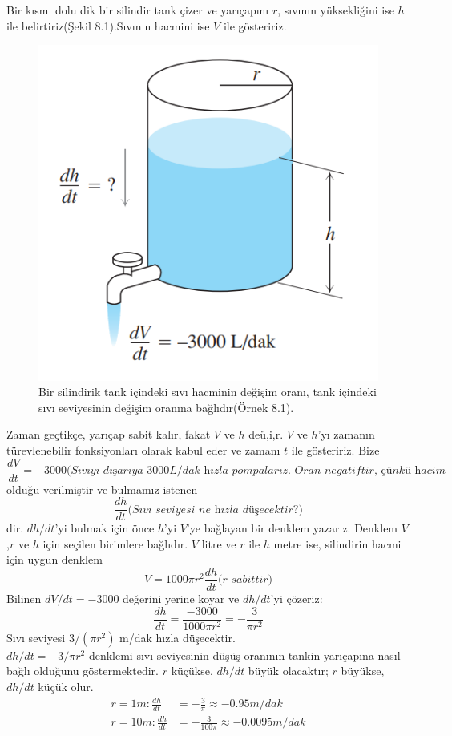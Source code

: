 \begin{cozum}
	Bir kısmı dolu dik bir silindir tank çizer ve yarıçapını $r$, sıvının yüksekliğini ise $h$ ile belirtiriz(Şekil 8.1).Sıvının hacmini ise $V$ ile gösteririz.
\begin{figure}[H]
	\centering
	\includegraphics[width=0.5\linewidth]{iliskilioranlar1.png}
	\caption{Bir silindirik tank içindeki sıvı hacminin değişim oranı, tank içindeki sıvı seviyesinin değişim oranına bağlıdır(Örnek 8.1).}
	\label{fig:ornekresim}
\end{figure}
Zaman geçtikçe, yarıçap sabit kalır, fakat $V$ ve $h$ deü,i,r. $V$ ve $h$'yı zamanın türevlenebilir fonksiyonları olarak kabul eder ve zamanı $t$ ile gösteririz. Bize
	\begin{equation*}
	\frac{dV}{dt}=-3000\textit{(Sıvıyı dışarıya 3000L/dak hızla pompalarız. Oran negatiftir, çünkü hacim azalmaktadır.)}
	\end{equation*}
olduğu verilmiştir ve bulmamız istenen
	\begin{equation*}
	\frac{dh}{dt}\textit{(Sıvı seviyesi ne hızla düşecektir?)}
	\end{equation*}
dir. $dh/dt$'yi bulmak için önce $h$'yi $V$'ye bağlayan bir denklem yazarız. Denklem $V$,$r$ ve $h$ için seçilen birimlere bağlıdır. $V$ litre ve $r$ ile $h$ metre ise, silindirin hacmi için uygun denklem
	\begin{equation*}
	V=1000\pi r^2 \frac{dh}{dt}\textit{($r$ sabittir)}
	\end{equation*}
Bilinen $dV/dt=-3000$ değerini yerine koyar ve $dh/dt$'yi çözeriz:
	\begin{equation*}
	\frac{dh}{dt}=\frac{-3000}{1000\pi r^2}=- \frac{3}{\pi r^2}
	\end{equation*}
Sıvı seviyesi $3/(\pi r^2)$ m/dak hızla düşecektir.\\
	$dh/dt = -3/\pi r^2$ denklemi sıvı seviyesinin düşüş oranının tankin yarıçapına nasıl bağlı olduğunu göstermektedir. $r$ küçükse, $dh/dt$ büyük olacaktır; $r$ büyükse, $dh/dt$ küçük olur.
	\begin{equation*}
	\begin{split}
	r=1 m:	\frac{dh}{dt}&=-\frac{3}{\pi}\approx-0.95\textit{m/dak}\\
	r=10 m: \frac{dh}{dt}&=-\frac{3}{100\pi}\approx-0.0095\textit{m/dak}
	\end{split}
	\end{equation*}
\end{cozum}\\





